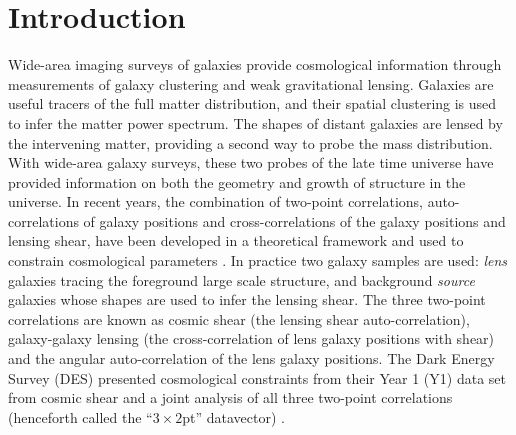 \documentclass[aps, prd,twocolumn,superscriptaddress,nofootinbib,preprintnumbers]{revtex4-1}
\newcommand{\IR}[1]{{\color{red}[\textbf{Note for IR}: #1]}}
\begin{document}



\section{Introduction}
\label{sec:intro}

Wide-area imaging surveys of galaxies provide cosmological information through measurements of galaxy clustering and weak gravitational lensing. Galaxies are useful tracers of the full matter distribution, and their spatial clustering is used to infer the matter power spectrum. The shapes of distant galaxies are lensed by the intervening matter, providing a second way to probe the mass distribution. With wide-area galaxy surveys, these two probes of the late time universe have provided  information on both the geometry and growth of structure in the universe. 
In recent years, the combination of two-point correlations, auto-correlations of galaxy positions and cross-correlations of the galaxy positions and lensing shear, have been developed in a theoretical framework \citep{Cacciato_2009,Baldauf_2010,Cacciato_2012,van_den_Bosch_2013, Wibking_2018} and used to constrain cosmological parameters  \citep{Cacciato_2013,Mandelbaum_2013,Kwan_2016,More_2015,Dvornik_2018,Coupon_2015, Singh_2019, Wibking_2019}. In practice two galaxy samples are used:  {\it lens} galaxies tracing the foreground large scale structure, and background {\it source} galaxies whose shapes are used to infer the lensing shear. The three two-point correlations are known as cosmic shear (the lensing shear auto-correlation), galaxy-galaxy lensing (the cross-correlation of lens galaxy positions with shear) and the angular auto-correlation of the lens galaxy positions.
The Dark Energy Survey (DES) presented cosmological constraints from their Year 1 (Y1) data set from cosmic shear \citep{Troxel_2018} and a joint analysis of all three two-point correlations (henceforth called the ``$3\times2$pt'' datavector) \citep{Abbott_2018}. 
\end{document}
